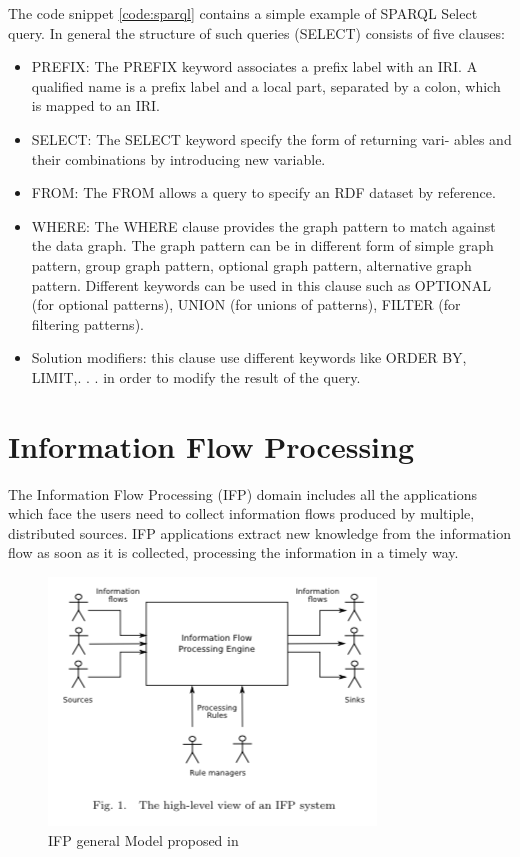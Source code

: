 The code snippet \ref{code:sparql} contains a simple example of SPARQL Select query. In general the structure of such queries (SELECT) consists of five clauses:
\begin{itemize}
\item PREFIX: The PREFIX keyword associates a prefix label with an IRI. A qualified name is a prefix label and a local part, separated by a colon, which is mapped to an IRI.
\item SELECT: The SELECT keyword specify the form of returning vari- ables and their combinations by introducing new variable.
\item FROM: The FROM allows a query to specify an RDF dataset by reference.
\item WHERE: The WHERE clause provides the graph pattern to match against the data graph. The graph pattern can be in different form of simple graph pattern, group graph pattern, optional graph pattern, alternative graph pattern. Different keywords can be used in this clause such as OPTIONAL (for optional patterns), UNION (for unions of patterns), FILTER (for filtering patterns).
\item Solution modifiers: this clause use different keywords like ORDER BY, LIMIT,. . . in order to modify the result of the query.
\end{itemize}


\section{Information Flow Processing}\label{sec:ifp}

The Information Flow Processing (IFP) domain includes all the applications which face the users need to collect information  flows produced by multiple, distributed sources. IFP applications extract new knowledge from the information flow as soon as it is collected, processing the information in a timely way.

\begin{figure}[tbh]
  \centering
	\includegraphics[width=0.75\linewidth]{images/ifp}
	\caption{IFP general Model proposed in \cite{Cugola:2012:PFI:2187671.2187677}  } 
  	\label{fig:ifp}
\end{figure}

